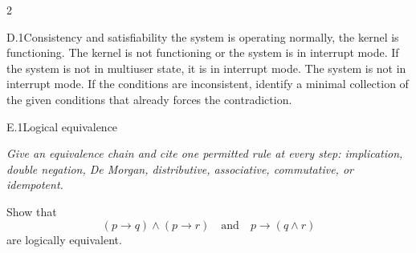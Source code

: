 \documentclass[9pt]{extarticle}
\begin{document}
\begin{multicols}{2}
\begin{CoreProblem}{D.1}{Consistency and satisfiability}
the system is operating normally, the kernel is functioning. The kernel is not
functioning or the system is in interrupt mode. If the system is not in
multiuser state, it is in interrupt mode. The system is not in interrupt mode.
If the conditions are inconsistent, identify a minimal collection of the given
conditions that already forces the contradiction.
\end{CoreProblem}
\begin{CoreProblem}{E.1}{Logical equivalence}
{\scriptsize\textit{Give an equivalence chain and cite one permitted rule at every step: implication, double negation, De Morgan, distributive, associative, commutative, or idempotent.}\par}
Show that
\[
  (p\to q)\land(p\to r)
  \quad\text{and}\quad
  p\to(q\land r)
\]
are logically equivalent.
\end{CoreProblem}
\end{multicols}
\CoreWorkArea
\FormBreak
{}
\end{document}
